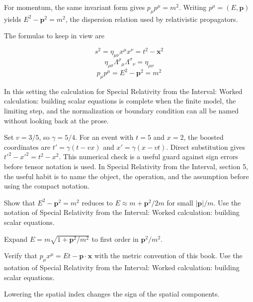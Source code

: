 For momentum, the same invariant form gives \(p_\mu p^\mu=m^2\).  Writing \(p^\mu=(E,\bm p)\) yields \(E^2-\bm p^2=m^2\), the dispersion relation used by relativistic propagators.

The formulas to keep in view are

\[
  s^2=\eta_{\mu\nu}x^\mu x^\nu=t^2-\bm x^2
\]
\[
  \eta_{\rho\sigma}\Lambda^\rho{}_\mu\Lambda^\sigma{}_\nu=\eta_{\mu\nu}
\]
\[
  p_\mu p^\mu=E^2-\bm p^2=m^2
\]

In this setting the calculation for Special Relativity from the Interval: Worked calculation: building scalar equations is complete when the finite model, the limiting step, and the normalization or boundary condition can all be named without looking back at the prose.




\begin{example}
Set \(v=3/5\), so \(\gamma=5/4\).  For an event with \(t=5\) and \(x=2\), the boosted coordinates are \(t'=\gamma(t-vx)\) and \(x'=\gamma(x-vt)\).  Direct substitution gives \(t'^2-x'^2=t^2-x^2\).  This numerical check is a useful guard against sign errors before tensor notation is used.  In Special Relativity from the Interval, section 5, the useful habit is to name the object, the operation, and the assumption before using the compact notation.
\end{example}



\begin{exercise}
Show that \(E^2-\bm p^2=m^2\) reduces to \(E\approx m+\bm p^2/2m\) for small \(|\bm p|/m\).  Use the notation of Special Relativity from the Interval: Worked calculation: building scalar equations.
\begin{answer}
Expand \(E=m\sqrt{1+\bm p^2/m^2}\) to first order in \(\bm p^2/m^2\).
\end{answer}
\end{exercise}

\begin{exercise}
Verify that \(p_\mu x^\mu=Et-\bm p\cdot\bm x\) with the metric convention of this book.  Use the notation of Special Relativity from the Interval: Worked calculation: building scalar equations.
\begin{answer}
Lowering the spatial index changes the sign of the spatial components.
\end{answer}
\end{exercise}



